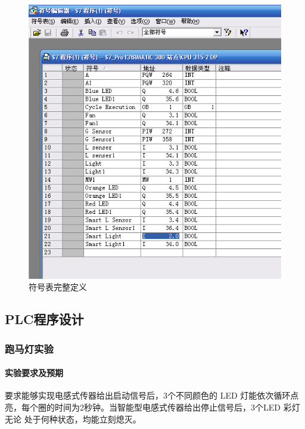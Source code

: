 \begin{figure}[htbp]
\centering
\includegraphics[width=12cm]{resource/sign_form_2.png}
\caption{符号表完整定义}
\label{fig:sign_form_2}
\end{figure}

\subsection{PLC程序设计}
\subsubsection{跑马灯实验}
\paragraph{实验要求及预期} 要求能够实现电感式传器给出启动信号后，3个不同颜色的 LED 灯能依次循环点亮，每个圈的时间为2秒钟。当智能型电感式传器给出停止信号后，3个LED 彩灯无论 处于何种状态，均能立刻熄灭。

